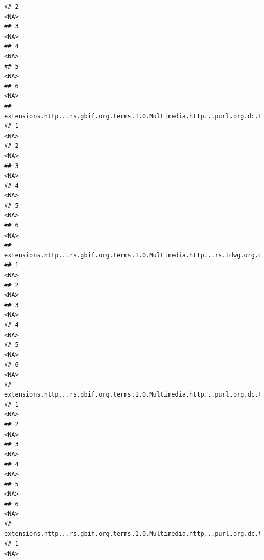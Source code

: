 \documentclass[
]{book}
\begin{document}
\begin{verbatim}
## 2                                                                                     <NA>
## 3                                                                                     <NA>
## 4                                                                                     <NA>
## 5                                                                                     <NA>
## 6                                                                                     <NA>
##   extensions.http...rs.gbif.org.terms.1.0.Multimedia.http...purl.org.dc.terms.type.9
## 1                                                                               <NA>
## 2                                                                               <NA>
## 3                                                                               <NA>
## 4                                                                               <NA>
## 5                                                                               <NA>
## 6                                                                               <NA>
##   extensions.http...rs.gbif.org.terms.1.0.Multimedia.http...rs.tdwg.org.dwc.terms.catalogNumber.9
## 1                                                                                            <NA>
## 2                                                                                            <NA>
## 3                                                                                            <NA>
## 4                                                                                            <NA>
## 5                                                                                            <NA>
## 6                                                                                            <NA>
##   extensions.http...rs.gbif.org.terms.1.0.Multimedia.http...purl.org.dc.terms.publisher.9
## 1                                                                                    <NA>
## 2                                                                                    <NA>
## 3                                                                                    <NA>
## 4                                                                                    <NA>
## 5                                                                                    <NA>
## 6                                                                                    <NA>
##   extensions.http...rs.gbif.org.terms.1.0.Multimedia.http...purl.org.dc.terms.license.9
## 1                                                                                  <NA>

\end{verbatim}
\end{document}
